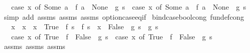 \begin{isabellebody}
\ \ \ {\isachardoublequoteopen}{\isacharparenleft}{\kern0pt}case\ x\ of\ Some\ a\ {\isasymRightarrow}\ f\ a\ {\isacharbar}{\kern0pt}\ None\ {\isasymRightarrow}\ g{\isacharparenright}{\kern0pt}\ s\ {\isacharequal}{\kern0pt}\ {\isacharparenleft}{\kern0pt}case\ x{\isacharprime}{\kern0pt}\ of\ Some\ a\ {\isasymRightarrow}\ f{\isacharprime}{\kern0pt}\ a\ {\isacharbar}{\kern0pt}\ None\ {\isasymRightarrow}\ g{\isacharprime}{\kern0pt}{\isacharparenright}{\kern0pt}\ s{\isachardoublequoteclose}\isanewline
%
\isadelimproof
\ \ %
\endisadelimproof
%
\isatagproof
{}\isamarkupfalse%
\ {\isacharparenleft}{\kern0pt}simp\ add{\isacharcolon}{\kern0pt}\ assms{\isacharparenleft}{\kern0pt}{}{\isacharparenright}{\kern0pt}\ assms{\isacharparenleft}{\kern0pt}{}{\isacharparenright}{\kern0pt}\ assms{\isacharparenleft}{\kern0pt}{}{\isacharparenright}{\kern0pt}\ option{\isachardot}{\kern0pt}case{\isacharunderscore}{\kern0pt}eq{\isacharunderscore}{\kern0pt}if{\isacharparenright}{\kern0pt}%
\endisatagproof
{\isafoldproof}%
%
\isadelimproof
\isanewline
%
\endisadelimproof
\isanewline
{}\isamarkupfalse%
\ bind{\isacharunderscore}{\kern0pt}case{\isacharunderscore}{\kern0pt}bool{\isacharunderscore}{\kern0pt}cong\ {\isacharbrackleft}{\kern0pt}fundef{\isacharunderscore}{\kern0pt}cong{\isacharbrackright}{\kern0pt}{\isacharcolon}{\kern0pt}\isanewline
\ \ \ {\isachardoublequoteopen}x\ {\isacharequal}{\kern0pt}\ x{\isacharprime}{\kern0pt}{\isachardoublequoteclose}\ \ {\isachardoublequoteopen}x\ {\isacharequal}{\kern0pt}\ True\ {\isasymLongrightarrow}\ f\ s\ {\isacharequal}{\kern0pt}\ f{\isacharprime}{\kern0pt}\ s{\isachardoublequoteclose}\ \ {\isachardoublequoteopen}x\ {\isacharequal}{\kern0pt}\ False\ {\isasymLongrightarrow}\ g\ s\ {\isacharequal}{\kern0pt}\ g{\isacharprime}{\kern0pt}\ s{\isachardoublequoteclose}\isanewline
\ \ \ {\isachardoublequoteopen}{\isacharparenleft}{\kern0pt}case\ x\ of\ True\ {\isasymRightarrow}\ f\ {\isacharbar}{\kern0pt}\ False\ {\isasymRightarrow}\ g{\isacharparenright}{\kern0pt}\ s\ {\isacharequal}{\kern0pt}\ {\isacharparenleft}{\kern0pt}case\ x{\isacharprime}{\kern0pt}\ of\ True\ {\isasymRightarrow}\ f{\isacharprime}{\kern0pt}\ {\isacharbar}{\kern0pt}\ False\ {\isasymRightarrow}\ g{\isacharprime}{\kern0pt}{\isacharparenright}{\kern0pt}\ s{\isachardoublequoteclose}\isanewline
%
\isadelimproof
\ \ %
\endisadelimproof
%
\isatagproof
{}\isamarkupfalse%
\ assms{\isacharparenleft}{\kern0pt}{}{\isacharparenright}{\kern0pt}\ assms{\isacharparenleft}{\kern0pt}{}{\isacharparenright}{\kern0pt}\ assms{\isacharparenleft}{\kern0pt}{}{\isacharparenright}{\kern0pt}\ \isamarkupfalse%

\end{isabellebody}

